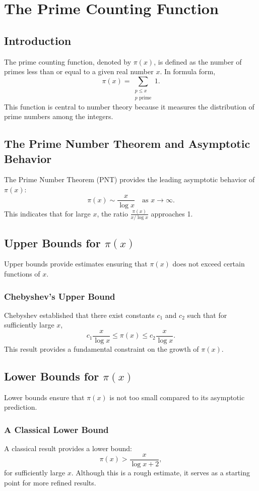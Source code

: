 \chapter{The Prime Counting Function}
\label{chap:prime_counting_function}

\section{Introduction}
The prime counting function, denoted by $\pi(x)$, is defined as the number of primes less than or equal to a given real number $x$. In formula form,
\[
\pi(x) = \sum_{\substack{p \le x \\ p \text{ prime}}} 1.
\]
This function is central to number theory because it measures the distribution of prime numbers among the integers.

\section{The Prime Number Theorem and Asymptotic Behavior}
The Prime Number Theorem (PNT) provides the leading asymptotic behavior of $\pi(x)$:
\[
\pi(x) \sim \frac{x}{\log x} \quad \text{as } x \to \infty.
\]
This indicates that for large $x$, the ratio $\frac{\pi(x)}{x/\log x}$ approaches 1.

\section{Upper Bounds for \texorpdfstring{$\pi(x)$}{pi(x)}}
Upper bounds provide estimates ensuring that $\pi(x)$ does not exceed certain functions of $x$.

\subsection{Chebyshev's Upper Bound}
Chebyshev established that there exist constants \(c_1\) and \(c_2\) such that for sufficiently large \(x\),
\[
c_1 \frac{x}{\log x} \leq \pi(x) \leq c_2 \frac{x}{\log x}.
\]
This result provides a fundamental constraint on the growth of $\pi(x)$.

\section{Lower Bounds for \texorpdfstring{$\pi(x)$}{pi(x)}}
Lower bounds ensure that $\pi(x)$ is not too small compared to its asymptotic prediction.

\subsection{A Classical Lower Bound}
A classical result provides a lower bound:
\[
\pi(x) > \frac{x}{\log x + 2},
\]
for sufficiently large $x$. Although this is a rough estimate, it serves as a starting point for more refined results.

